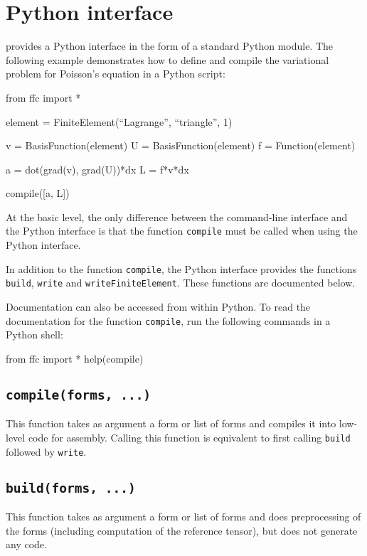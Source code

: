 \chapter{Python interface}

\ffc{} provides a Python interface in the form of a standard
Python module. The following example demonstrates how to define and
compile the variational problem for Poisson's equation in a Python
script:

\begin{code}
from ffc import *

element = FiniteElement(``Lagrange'', ``triangle'', 1)

v = BasisFunction(element)
U = BasisFunction(element)
f = Function(element)
 
a = dot(grad(v), grad(U))*dx
L = f*v*dx

compile([a, L])
\end{code}

At the basic level, the only difference between the command-line
interface and the Python interface is that the function
\texttt{compile} must be called when using the Python interface.

In addition to the function \texttt{compile}, the Python interface
provides the functions \texttt{build}, \texttt{write} and
\texttt{writeFiniteElement}. These functions are documented below.

Documentation can also be accessed from within Python. To read the
documentation for the function \texttt{compile}, run the following
commands in a Python shell:

\begin{code}
from ffc import *
help(compile)
\end{code}

\section{\texttt{compile(forms, ...)}}

This function takes as argument a form or list of forms and compiles
it into low-level code for assembly. Calling this function is
equivalent to first calling \texttt{build} followed by \texttt{write}.

\section{\texttt{build(forms, ...)}}

This function takes as argument a form or list of forms
and does preprocessing of the forms (including computation of the
reference tensor), but does not generate any code.

